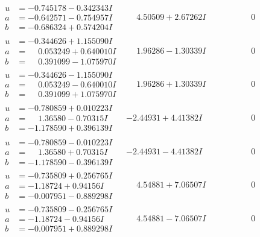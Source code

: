 \documentclass[1p]{elsarticle_modified}
\theoremstyle{definition}
\begin{document}
$$\begin{array}{c|c|c}
\begin{aligned}
u &= -0.745178 - 0.342343 I \\
a &= -0.642571 - 0.754957 I \\
b &= -0.686324 + 0.574204 I\end{aligned}
 & \phantom{-}4.50509 + 2.67262 I & \phantom{-0.000000 } 0 \\ \hline\begin{aligned}
u &= -0.344626 + 1.155090 I \\
a &= \phantom{-}0.053249 + 0.640010 I \\
b &= \phantom{-}0.391099 - 1.075970 I\end{aligned}
 & \phantom{-}1.96286 - 1.30339 I & \phantom{-0.000000 } 0 \\ \hline\begin{aligned}
u &= -0.344626 - 1.155090 I \\
a &= \phantom{-}0.053249 - 0.640010 I \\
b &= \phantom{-}0.391099 + 1.075970 I\end{aligned}
 & \phantom{-}1.96286 + 1.30339 I & \phantom{-0.000000 } 0 \\ \hline\begin{aligned}
u &= -0.780859 + 0.010223 I \\
a &= \phantom{-}1.36580 - 0.70315 I \\
b &= -1.178590 + 0.396139 I\end{aligned}
 & -2.44931 + 4.41382 I & \phantom{-0.000000 } 0 \\ \hline\begin{aligned}
u &= -0.780859 - 0.010223 I \\
a &= \phantom{-}1.36580 + 0.70315 I \\
b &= -1.178590 - 0.396139 I\end{aligned}
 & -2.44931 - 4.41382 I & \phantom{-0.000000 } 0 \\ \hline\begin{aligned}
u &= -0.735809 + 0.256765 I \\
a &= -1.18724 + 0.94156 I \\
b &= -0.007951 - 0.889298 I\end{aligned}
 & \phantom{-}4.54881 + 7.06507 I & \phantom{-0.000000 } 0 \\ \hline\begin{aligned}
u &= -0.735809 - 0.256765 I \\
a &= -1.18724 - 0.94156 I \\
b &= -0.007951 + 0.889298 I\end{aligned}
 & \phantom{-}4.54881 - 7.06507 I & \phantom{-0.000000 } 0 \\ \hline\begin{aligned}

\end{aligned}
\end{array}$$
\end{document}
